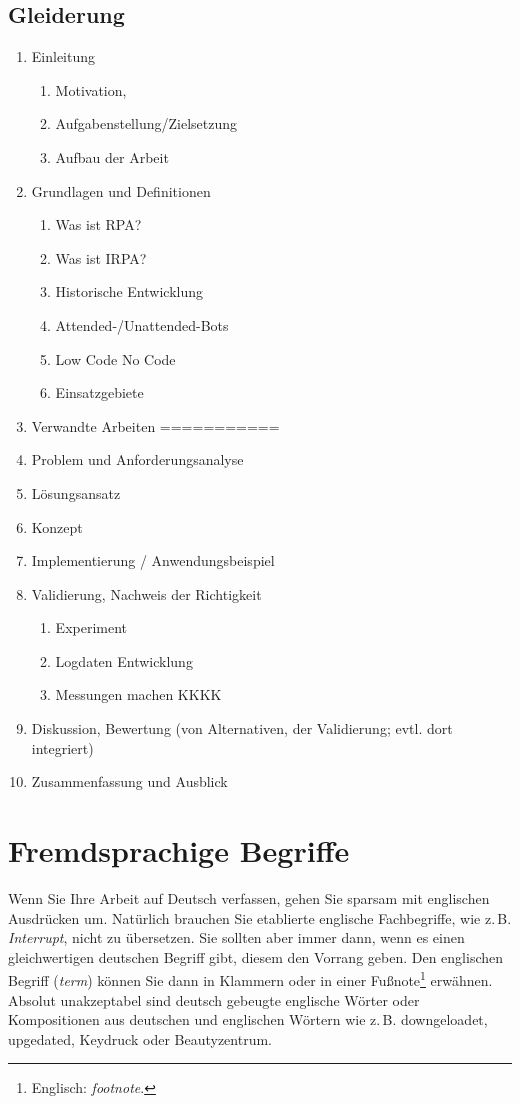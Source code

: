 \subsection{Gleiderung}
\begin{enumerate}
	\item {Einleitung}
		\begin{enumerate}
			\item Motivation,
			\item Aufgabenstellung/Zielsetzung
			\item Aufbau der Arbeit
		\end{enumerate}
	\item {Grundlagen und Definitionen}
		\begin{enumerate}
			\item Was ist RPA?
			\item Was ist IRPA?
			\item Historische Entwicklung
			\item Attended-/Unattended-Bots
			\item Low Code No Code
			\item Einsatzgebiete
		\end{enumerate}
	\item {Verwandte Arbeiten ===========}
	\item {Problem und Anforderungsanalyse}
	\item {Lösungsansatz}
	\item {Konzept}
	\item {Implementierung / Anwendungsbeispiel}
	\item {Validierung, Nachweis der Richtigkeit}
		\begin{enumerate}
			\item Experiment
			\item Logdaten Entwicklung
			\item Messungen machen KKKK
		\end{enumerate}
	\item {Diskussion, Bewertung (von Alternativen, der Validierung; evtl. dort integriert)}
	\item {Zusammenfassung und Ausblick}
\end{enumerate}

\newpage

\section*{Fremdsprachige Begriffe}

Wenn Sie Ihre Arbeit auf Deutsch verfassen, gehen Sie sparsam mit englischen Ausdrücken um. Natürlich brauchen Sie etablierte englische Fachbegriffe, wie z.\,B. \textit{Interrupt}, nicht zu übersetzen. Sie sollten aber immer dann, wenn es einen gleichwertigen deutschen Begriff gibt, diesem den Vorrang geben. Den englischen Begriff (\textit{term}) können Sie dann in Klammern oder in einer Fußnote\footnote{Englisch: \textit{footnote}.} erwähnen. Absolut unakzeptabel sind deutsch gebeugte englische Wörter oder Kompositionen aus deutschen und englischen Wörtern wie z.\,B. downgeloadet, upgedated, Keydruck oder Beautyzentrum.


